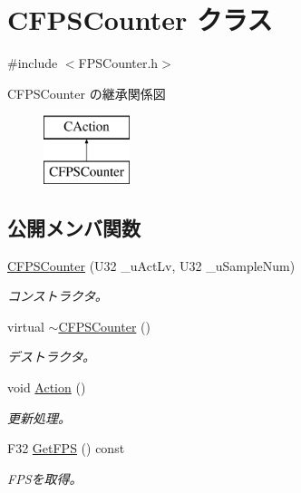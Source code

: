 \hypertarget{class_c_f_p_s_counter}{}\section{C\+F\+P\+S\+Counter クラス}
\label{class_c_f_p_s_counter}


{\ttfamily \#include $<$F\+P\+S\+Counter.\+h$>$}

C\+F\+P\+S\+Counter の継承関係図\begin{figure}[H]
\begin{center}
\leavevmode
\includegraphics[height=2.000000cm]{class_c_f_p_s_counter}
\end{center}
\end{figure}
\subsection*{公開メンバ関数}
\begin{DoxyCompactItemize}
\item 
\hyperlink{class_c_f_p_s_counter_a2529e1d7efc77fe1c24f9161bae4eab4}{C\+F\+P\+S\+Counter} (U32 \+\_\+u\+Act\+Lv, U32 \+\_\+u\+Sample\+Num)
\begin{DoxyCompactList}\small\item\em コンストラクタ。 \end{DoxyCompactList}\item 
virtual \hyperlink{class_c_f_p_s_counter_a58e43daf84e7df4964508f43d55038f3}{$\sim$\+C\+F\+P\+S\+Counter} ()
\begin{DoxyCompactList}\small\item\em デストラクタ。 \end{DoxyCompactList}\item 
void \hyperlink{class_c_f_p_s_counter_acc82281b59837fb8378cbd5ef8941072}{Action} ()
\begin{DoxyCompactList}\small\item\em 更新処理。 \end{DoxyCompactList}\item 
F32 \hyperlink{class_c_f_p_s_counter_a2ac0a4c5774a5208b6af18f31c7dcddf}{Get\+F\+P\+S} () const 
\begin{DoxyCompactList}\small\item\em F\+P\+Sを取得。 \end{DoxyCompactList}\end{DoxyCompactItemize}
